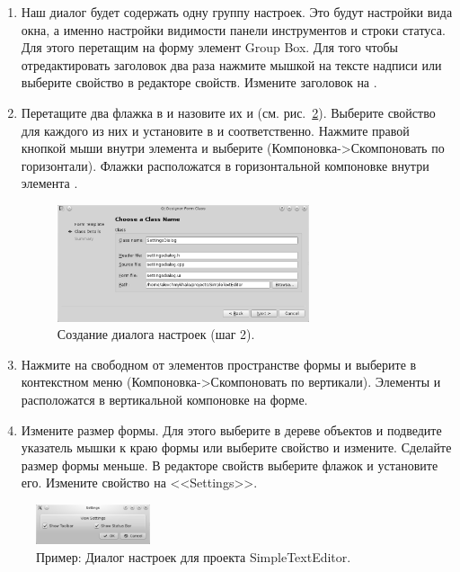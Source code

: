 \begin{enumerate}
\item Наш диалог будет содержать одну группу настроек. Это будут настройки вида окна, а именно настройки видимости
панели инструментов и строки статуса. Для этого перетащим на форму элемент Group Box. Для того чтобы отредактировать
заголовок два раза нажмите мышкой на тексте надписи или выберите свойство  в редакторе свойств.
Измените заголовок на .
\item Перетащите два флажка в  и назовите их  и  (см. рис.~\ref{ch15:refDrawing11}). Выберите свойство  для
каждого из них и установите в  и
 соответственно. Нажмите правой кнопкой мыши внутри элемента 
 и выберите  (Компоновка->Скомпоновать по
горизонтали). Флажки расположатся в горизонтальной компоновке внутри элемента .
\begin{figure}[htb]
\begin{center}
\includegraphics[width=0.7\textwidth]{img/ris_15_11}
\caption[Создание диалога настроек (шаг 2).]{Создание диалога настроек (шаг 2).}
\label{ch15:refDrawing10}
\end{center}
\end{figure}

\item Нажмите на свободном от элементов пространстве формы и выберите в контекстном меню 
 (Компоновка->Скомпоновать по вертикали). 
Элементы  и  расположатся в вертикальной компоновке на форме. 
\item Измените размер формы. Для этого выберите  в дереве объектов и подведите указатель
мышки к краю формы или выберите свойство  и измените. Сделайте размер формы меньше. В редакторе
свойств выберите флажок  и установите его. Измените свойство  на
<<Settings>>. 
\end{enumerate}
\begin{figure}[htb]
\begin{center}
\includegraphics[width=0.3\textwidth]{img/ris_15_12}
\caption[Пример: Диалог настроек для проекта SimpleTextEditor.]{Пример: Диалог настроек для проекта
SimpleTextEditor.}
\label{ch15:refDrawing11}
\end{center}
\end{figure}

